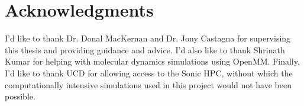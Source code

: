 \chapter*{Acknowledgments}
\label{sec:acknowledgments}

I'd like to thank Dr. Donal MacKernan and Dr. Jony Castagna for supervising this thesis
and providing guidance and advice. I'd also like to thank Shrinath Kumar for helping 
with molecular dynamics simulations using OpenMM. Finally, I'd like to thank UCD 
for allowing access to the Sonic HPC, without which the computationally intensive simulations used in this 
project would not have been possible. 